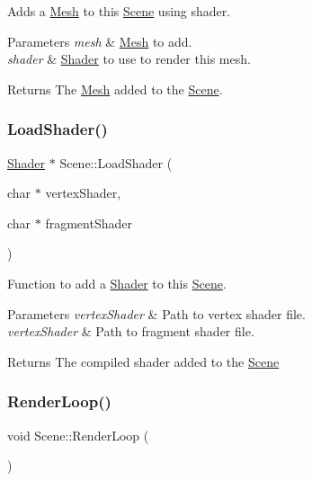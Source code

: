 Adds a \hyperlink{class_mesh}{Mesh} to this \hyperlink{class_scene}{Scene} using shader.


\begin{DoxyParams}{Parameters}
{\em mesh} & \hyperlink{class_mesh}{Mesh} to add. \\
\hline
{\em shader} & \hyperlink{class_shader}{Shader} to use to render this mesh. \\
\hline
\end{DoxyParams}
\begin{DoxyReturn}{Returns}
The \hyperlink{class_mesh}{Mesh} added to the \hyperlink{class_scene}{Scene}. 
\end{DoxyReturn}
\mbox{\label{class_scene_a6f0f7af3d07acbee2d6864c3ded98351}} 
\subsubsection{\texorpdfstring{Load\+Shader()}{LoadShader()}}
{\footnotesize\ttfamily \hyperlink{class_shader}{Shader} $\ast$ Scene\+::\+Load\+Shader (\begin{DoxyParamCaption}\item[{char $\ast$}]{vertex\+Shader,  }\item[{char $\ast$}]{fragment\+Shader }\end{DoxyParamCaption})}



Function to add a \hyperlink{class_shader}{Shader} to this \hyperlink{class_scene}{Scene}. 


\begin{DoxyParams}{Parameters}
{\em vertex\+Shader} & Path to vertex shader file. \\
\hline
{\em vertex\+Shader} & Path to fragment shader file. \\
\hline
\end{DoxyParams}
\begin{DoxyReturn}{Returns}
The compiled shader added to the \hyperlink{class_scene}{Scene} 
\end{DoxyReturn}
\mbox{\label{class_scene_a71708279f69885e838e288c6689ddd1c}} 
\subsubsection{\texorpdfstring{Render\+Loop()}{RenderLoop()}}
{\footnotesize\ttfamily void Scene\+::\+Render\+Loop (\begin{DoxyParamCaption}{ }\end{DoxyParamCaption})}



